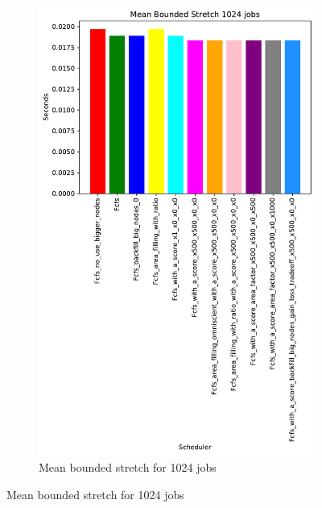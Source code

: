 \documentclass[a4paper]{article}
\begin{document}
\begin{figure}[H]
\begin{subfigure}[b]{0.4\linewidth}\centering\includegraphics[width=0.7\linewidth]{MBSS/plot/Results_Size_And_Data_2022-03-01->2022-03-03_V9532_Mean_Stretch_With_a_Minimum_1024_450_128_32_256_4_1024.pdf}\caption{Mean bounded stretch for 1024 jobs}\label{45}\end{subfigure}

\end{figure}
\end{document}
